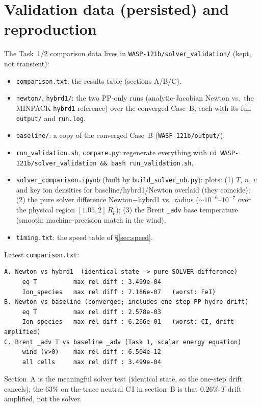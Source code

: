 \documentclass[english,a4paper]{my_memo}
\begin{document}
\section{Validation data (persisted) and reproduction}\label{sec:valdata}
The Task~1/2 comparison data lives in \texttt{WASP-121b/solver\_validation/}
(kept, not transient):
\begin{itemize}
\item \texttt{comparison.txt}: the results table (sections A/B/C).
\item \texttt{newton/}, \texttt{hybrd1/}: the two PP-only runs (analytic-Jacobian
  Newton vs.\ the MINPACK \texttt{hybrd1} reference) over the converged Case~B, each
  with its full \texttt{output/} and \texttt{run.log}.
\item \texttt{baseline/}: a copy of the converged Case~B
  (\texttt{WASP-121b/output/}).
\item \texttt{run\_validation.sh}, \texttt{compare.py}: regenerate everything
  with \texttt{cd WASP-121b/solver\_validation \&\& bash run\_validation.sh}.
\item \texttt{solver\_comparison.ipynb} (built by \texttt{build\_solver\_nb.py}):
  plots: (1) $T$, $n$, $v$ and key ion densities for baseline/hybrd1/Newton
  overlaid (they coincide); (2) the pure solver difference Newton$-$hybrd1 vs.\
  radius ($\sim10^{-6}$--$10^{-7}$ over the physical region $[1.05,2]\,R_p$);
  (3) the Brent \texttt{\_adv} base temperature (smooth; machine-precision match in
  the wind).
\item \texttt{timing.txt}: the speed table of \S\ref{sec:speed}.
\end{itemize}
Latest \texttt{comparison.txt}:
\begin{lstlisting}
A. Newton vs hybrd1  (identical state -> pure SOLVER difference)
     eq T          max rel diff : 3.499e-04
     Ion_species   max rel diff : 7.186e-07   (worst: FeI)
B. Newton vs baseline (converged; includes one-step PP hydro drift)
     eq T          max rel diff : 2.578e-03
     Ion_species   max rel diff : 6.266e-01   (worst: CI, drift-amplified)
C. Brent _adv T vs baseline _adv (Task 1, scalar energy equation)
     wind (v>0)    max rel diff : 6.504e-12
     all cells     max rel diff : 3.499e-04
\end{lstlisting}
Section~A is the meaningful solver test (identical state, so the one-step drift
cancels); the 63\% on the trace neutral C\,I in section~B is that $0.26\%$ $T$
drift amplified, not the solver.
\end{document}
